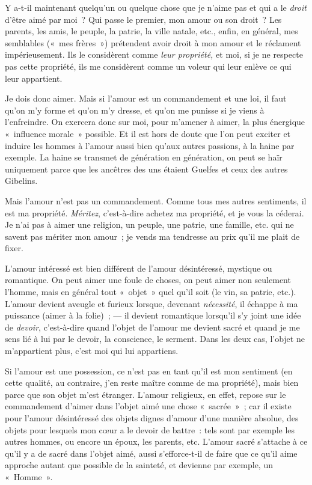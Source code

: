 \documentclass[french,twoside]{book} %
\begin{document}
Y a-t-il maintenant quelqu’un ou quelque chose que je n’aime pas et qui a le \emph{droit} d’être aimé par moi ? Qui passe le premier, mon amour ou son droit ? Les parents, les amis, le peuple, la patrie, la ville natale, etc., enfin, en général, mes semblables (« mes frères ») prétendent avoir droit à mon amour et le réclament impérieusement. Ils le considèrent comme \emph{leur propriété,} et moi, si je ne respecte pas cette propriété, ils me considèrent comme un voleur qui leur enlève ce qui leur appartient.\par
Je dois donc aimer. Mais si l’amour est un commandement et une loi, il faut qu’on m’y forme et qu’on m’y dresse, et qu’on me punisse si je viens à l’enfreindre. On exercera donc sur moi, pour m’amener à aimer, la plus énergique « influence morale » possible. Et il est hors de doute que l’on peut exciter et induire les hommes à l’amour aussi bien qu’aux autres passions, à la haine par exemple. La haine se transmet de génération en génération, on peut se haïr uniquement parce que les ancêtres des uns étaient Guelfes et ceux des autres Gibelins.\par
Mais l’amour n’est pas un commandement. Comme tous mes autres sentiments, il est ma propriété. \emph{Méritez}, c’est-à-dire achetez ma propriété, et je vous la céderai. Je n’ai pas à aimer une religion, un peuple, une patrie, une famille, etc. qui ne savent pas mériter mon amour ; je vends ma tendresse au prix qu’il me plait de fixer.\par
L’amour intéressé est bien différent de l’amour désintéressé, mystique ou romantique. On peut aimer une foule de choses, on peut aimer non seulement l’homme, mais en général tout « objet » quel qu’il  soit (le vin, sa patrie, etc.). L’amour devient aveugle et furieux lorsque, devenant \emph{nécessité}, il échappe à ma puissance (aimer à la folie) ; — il devient romantique lorsqu’il s’y joint une idée de \emph{devoir}, c’est-à-dire quand l’objet de l’amour me devient sacré et quand je me sens lié à lui par le devoir, la conscience, le serment. Dans les deux cas, l’objet ne m’appartient plus, c’est moi qui lui appartiens.\par
Si l’amour est une possession, ce n’est pas en tant qu’il est mon sentiment (en cette qualité, au contraire, j’en reste maître comme de ma propriété), mais bien parce que son objet m’est étranger. L’amour religieux, en effet, repose sur le commandement d’aimer dans l’objet aimé une chose « sacrée » ; car il existe pour l’amour désintéressé des objets dignes d’amour d’une manière absolue, des objets pour lesquels mon cœur a le devoir de battre : tels sont par exemple les autres hommes, ou encore un époux, les parents, etc. L’amour sacré s’attache à ce qu’il y a de sacré dans l’objet aimé, aussi s’efforce-t-il de faire que ce qu’il aime approche autant que possible de la sainteté, et devienne par exemple, un « Homme ».\par
\end{document}
